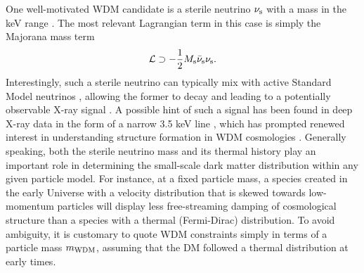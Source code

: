 One well-motivated WDM candidate is a sterile neutrino $\nu_{\rm s}$ with a mass in the keV range \citep[\eg][]{Abazajian:2017tcc,Adhikari:2017}. The most relevant Lagrangian term in this case is simply the Majorana mass term
\begin{equation}
    \mathcal{L} \supset -\frac{1}{2}M_{\rm s}\bar{\nu}_{\rm s} \nu_{\rm s}.
\end{equation}
Interestingly, such a sterile neutrino can typically mix with active Standard Model neutrinos \citep[see \eg][]{Asaka:2005an}, allowing the former to decay and leading to a potentially observable X-ray signal \citep{Abazajian:2001vt}. A possible hint of such a signal has been found in deep X-ray data in the form of a narrow 3.5 keV line \citep{Boyarsky:2014, Bulbul:2014, Boyarsky:2015, Iakubovskyi:2015}, which has prompted renewed interest in understanding structure formation in WDM cosmologies \citep[see \eg][]{Lovell:2013ola,Bose:2016irl,Bozek:2018ekc}. Generally speaking, both the sterile neutrino mass and its thermal history play an important role in determining the small-scale dark matter distribution within any given particle model. For instance, at a fixed particle mass, a species created in the early Universe with a velocity distribution that is skewed towards low-momentum particles \citep[\eg][]{Shi:1998km,Venumadhav:2015pla} will display less free-streaming damping of cosmological structure than a species with a thermal (Fermi-Dirac) distribution. To avoid ambiguity, it is customary to quote WDM constraints simply in terms of a particle mass $m_{\rm WDM}$, assuming that the DM followed a thermal distribution at early times.


